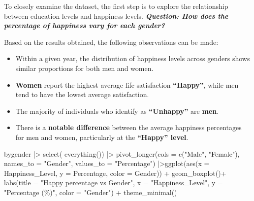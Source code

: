 \documentclass[
  11pt,
  a4paper,
  DIV=11,
  numbers=noendperiod]{scrartcl}
\newenvironment{Shaded}{\begin{snugshade}}{\end{snugshade}}
\newcommand{\AttributeTok}[1]{\textcolor[rgb]{0.40,0.45,0.13}{#1}}
\newcommand{\FunctionTok}[1]{\textcolor[rgb]{0.28,0.35,0.67}{#1}}
\newcommand{\NormalTok}[1]{\textcolor[rgb]{0.00,0.23,0.31}{#1}}
\newcommand{\SpecialCharTok}[1]{\textcolor[rgb]{0.37,0.37,0.37}{#1}}
\newcommand{\StringTok}[1]{\textcolor[rgb]{0.13,0.47,0.30}{#1}}
\begin{document}
To closely examine the dataset, the first step is to explore the
relationship between education levels and happiness levels.
{\textbf{\emph{Question: How does the percentage of happiness vary for
each gender?}}}

Based on the results obtained, the following observations can be made:

\begin{itemize}
\item
  Within a given year, the distribution of happiness levels across
  genders shows similar proportions for both men and women.
\item
  {\textbf{Women}} report the highest average life satisfaction
  {\textbf{``Happy''}}, while men tend to have the lowest average
  satisfaction.
\item
  The majority of individuals who identify as {\textbf{``Unhappy''}} are
  {\textbf{men}}.
\item
  There is a {\textbf{notable difference}} between the average happiness
  percentages for men and women, particularly at the {\textbf{``Happy''
  level}}.
\end{itemize}

\begin{Shaded}
\begin{Highlighting}[]
\NormalTok{ bygender }\SpecialCharTok{|\textgreater{}} 
  \FunctionTok{select}\NormalTok{( }\FunctionTok{everything}\NormalTok{()) }\SpecialCharTok{|\textgreater{}}
  \FunctionTok{pivot\_longer}\NormalTok{(}\AttributeTok{cols =} \FunctionTok{c}\NormalTok{(}\StringTok{"Male"}\NormalTok{, }\StringTok{"Female"}\NormalTok{), }\AttributeTok{names\_to =} \StringTok{"Gender"}\NormalTok{, }\AttributeTok{values\_to =} \StringTok{"Percentage"}\NormalTok{) }\SpecialCharTok{|\textgreater{}}\FunctionTok{ggplot}\NormalTok{(}\FunctionTok{aes}\NormalTok{(}\AttributeTok{x =}\NormalTok{ Happiness\_Level, }\AttributeTok{y =}\NormalTok{ Percentage, }\AttributeTok{color =}\NormalTok{ Gender)) }\SpecialCharTok{+}
  \FunctionTok{geom\_boxplot}\NormalTok{()}\SpecialCharTok{+}
  \FunctionTok{labs}\NormalTok{(}\AttributeTok{title =} \StringTok{"Happy percentage vs Gender"}\NormalTok{,}
       \AttributeTok{x =} \StringTok{"Happiness\_Level"}\NormalTok{, }\AttributeTok{y =} \StringTok{"Percentage (\%)"}\NormalTok{, }\AttributeTok{color =} \StringTok{"Gender"}\NormalTok{) }\SpecialCharTok{+}
  \FunctionTok{theme\_minimal}\NormalTok{()}
\end{Highlighting}
\end{Shaded}
\end{document}

